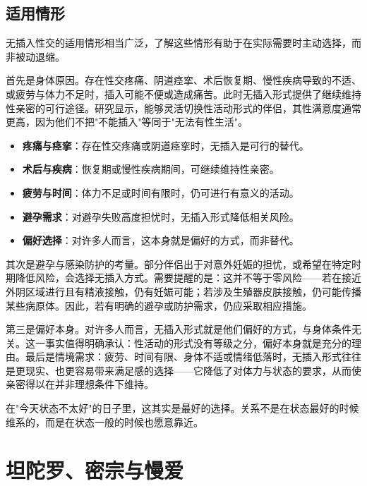 \documentclass[12pt,UTF8]{ctexbook}
\newcommand{\keyword}[1]{\textbf{#1}}
\begin{document}
\subsection{适用情形}

无插入性交的适用情形相当广泛，了解这些情形有助于在实际需要时主动选择，而非被动退缩。

首先是身体原因。存在性交疼痛、阴道痉挛、术后恢复期、慢性疾病导致的不适、或疲劳与体力不足时，插入可能不便或造成痛苦。此时无插入形式提供了继续维持性亲密的可行途径。研究显示，能够灵活切换性活动形式的伴侣，其性满意度通常更高，因为他们不把"不能插入"等同于"无法有性生活"。

\begin{itemize}
	\item \keyword{疼痛与痉挛}：存在性交疼痛或阴道痉挛时，无插入是可行的替代。
	\item \keyword{术后与疾病}：恢复期或慢性疾病期间，可继续维持性亲密。
	\item \keyword{疲劳与时间}：体力不足或时间有限时，仍可进行有意义的活动。
	\item \keyword{避孕需求}：对避孕失败高度担忧时，无插入形式降低相关风险。
	\item \keyword{偏好选择}：对许多人而言，这本身就是偏好的方式，而非替代。
\end{itemize}

其次是避孕与感染防护的考量。部分伴侣出于对意外妊娠的担忧，或希望在特定时期降低风险，会选择无插入方式。需要提醒的是：这并不等于零风险——若在接近外阴区域进行且有精液接触，仍有妊娠可能；若涉及生殖器皮肤接触，仍可能传播某些病原体。因此，若有明确的避孕或防护需求，仍应采取相应措施。

第三是偏好本身。对许多人而言，无插入形式就是他们偏好的方式，与身体条件无关。这一事实值得明确承认：性活动的形式没有等级之分，偏好本身就是充分的理由。最后是情境需求：疲劳、时间有限、身体不适或情绪低落时，无插入形式往往是更现实、也更容易带来满足感的选择——它降低了对体力与状态的要求，从而使亲密得以在并非理想条件下维持。

\begin{tcolorbox}[colback=pink!5!white,colframe=red!50!black,title=贴心小叮咛]
	在"今天状态不太好"的日子里，这其实是最好的选择。关系不是在状态最好的时候维系的，而是在状态一般的时候也愿意靠近。
\end{tcolorbox}

\section{坦陀罗、密宗与慢爱}
\end{document}
